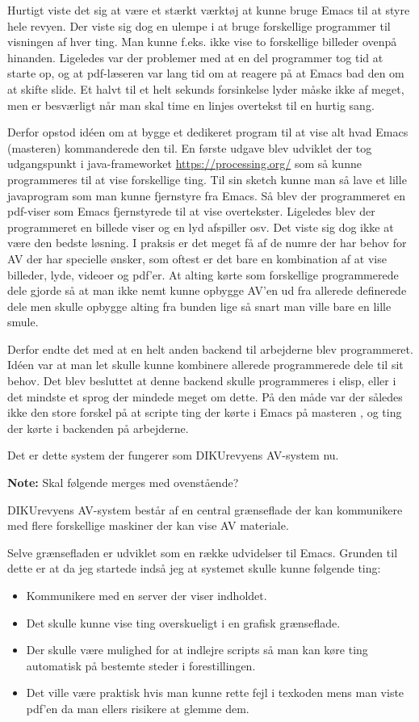 \documentclass[10pt,a4paper,danish]{article}
\newcommand{\note}[1]{\begin{mdframed}[style=note]\textbf{Note:}
    #1\end{mdframed}}
\begin{document}
{  Hurtigt viste det sig at være et stærkt værktøj at kunne bruge Emacs til at
  styre hele revyen. Der viste sig dog en ulempe i at bruge forskellige
  programmer til visningen af hver ting. Man kunne f.eks. ikke vise to
  forskellige billeder ovenpå hinanden.
  Ligeledes var der problemer med at en del programmer tog tid at starte op, og
  at pdf-læseren var lang tid om at reagere på at Emacs bad den om at skifte
  slide. Et halvt til et helt sekunds forsinkelse lyder måske ikke af meget, men
  er besværligt når man skal time en linjes overtekst til en hurtig sang.

  Derfor opstod idéen om at bygge et dedikeret program til at vise alt hvad
  Emacs (masteren) kommanderede den til. En første udgave blev udviklet der tog
  udgangspunkt i java-frameworket \url{https://processing.org/} som så kunne
  programmeres til at vise forskellige ting. Til sin sketch kunne man så lave et
  lille javaprogram som man kunne fjernstyre fra Emacs.
  Så blev der programmeret en pdf-viser som Emacs fjernstyrede til at vise
  overtekster. Ligeledes blev der programmeret en billede viser og en lyd
  afspiller osv. Det viste sig dog ikke at være den bedste løsning. I praksis er
  det meget få af de numre der har behov for AV der har specielle ønsker, som
  oftest er det bare en kombination af at vise billeder, lyde, videoer og
  pdf'er. At alting kørte som forskellige programmerede dele gjorde så at man
  ikke nemt kunne opbygge AV'en ud fra allerede definerede dele men skulle
  opbygge alting fra bunden lige så snart man ville bare en lille smule.

  Derfor endte det med at en helt anden backend til arbejderne blev
  programmeret. Idéen var at man let skulle kunne kombinere allerede
  programmerede dele til sit behov. Det blev besluttet at denne backend skulle
  programmeres i elisp, eller i det mindste et sprog der mindede meget om dette.
  På den måde var der således ikke den store forskel på at scripte ting der
  kørte i Emacs på masteren , og ting der kørte i backenden på arbejderne.

  Det er dette system der fungerer som DIKUrevyens AV-system nu.
}
\note{Skal følgende merges med ovenstående?}
DIKUrevyens AV-system består af en central grænseflade der kan kommunikere med flere
forskellige maskiner der kan vise AV materiale.

Selve grænsefladen er udviklet som en række udvidelser til Emacs.
Grunden til dette er at da jeg startede indså jeg at systemet skulle kunne
følgende ting:
\begin{itemize}
\item Kommunikere med en server der viser indholdet.
\item Det skulle kunne vise ting overskueligt i en grafisk grænseflade.
\item Der skulle være mulighed for at indlejre scripts så man kan køre ting
  automatisk på bestemte steder i forestillingen.
\item Det ville være praktisk hvis man kunne rette fejl i texkoden mens man
  viste pdf'en da man ellers risikere at glemme dem.
\end{itemize}
\end{document}
